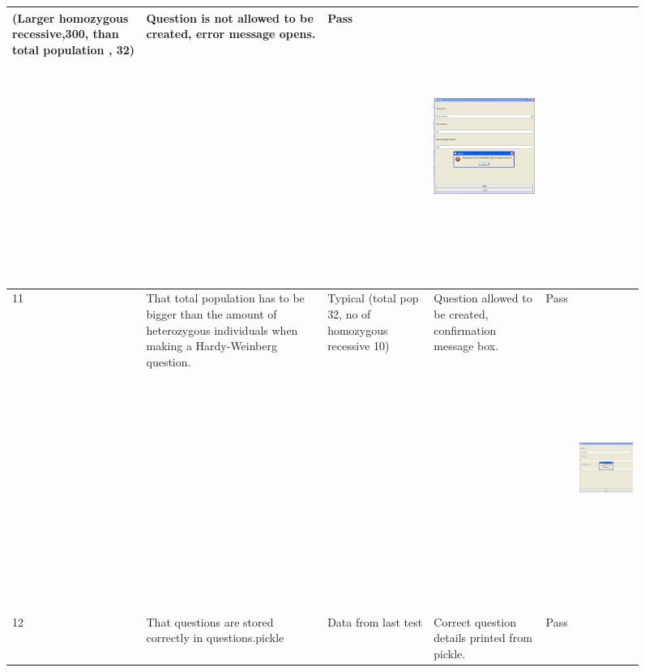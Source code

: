 \documentclass[letterpaper]{article}
\begin{document}
\begin{figure}[hbp]
\begin{minipage}{12.1146in}
\begin{flushleft}
\begin{supertabular}{|m{0.8913598in}|m{1.0997599in}|m{3.3018599in}|m{0.8809598in}|m{0.6198598in}|m{4.84626in}|}
{\color{black} (Larger homozygous recessive,300, than total population , 32)} &
{\color{black} Question is not allowed to be created, error message opens.} &
{\color{black} Pass} &
 \includegraphics[width=3.698in,height=3.4898in]{Tests_files/image016.jpg} \\\hline
{\color{black} 11} &
{\color{black} That total population has to be bigger than the amount of heterozygous individuals when making a
Hardy-Weinberg question.} &
{\color{black} Typical (total pop 32, no of homozygous recessive 10)} &
{\color{black} Question allowed to be created, confirmation message box.} &
{\color{black} Pass} &
{\color{black} ~}

 \includegraphics[width=3.7602in,height=3.5626in]{Tests_files/image017.jpg} \\\hline
{\color{black} 12} &
{\color{black} That questions are stored correctly in questions.pickle} &
{\color{black} Data from last test} &
{\color{black} Correct question details printed from pickle.} &
{\color{black} Pass} &
{\color{black} ~}


\end{supertabular}
\end{flushleft}
\end{minipage}
\end{figure}
\end{document}
